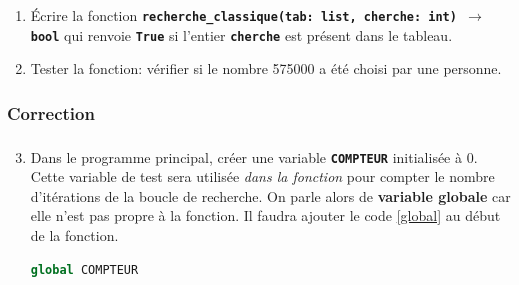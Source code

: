 \documentclass[svgnames,11pt]{beamer}
\begin{document}
\begin{frame}[fragile]
    \frametitle{}

    \begin{activite}
        \begin{enumerate}
            \item Écrire la fonction \textbf{\texttt{recherche\_classique(tab: list, cherche: int) $\rightarrow$ bool}} qui renvoie \textbf{\texttt{True}} si l'entier \textbf{\texttt{cherche}} est présent dans le tableau.
            \item Tester la fonction: vérifier si le nombre 575000 a été choisi par une personne.
        \end{enumerate}
    \end{activite} 
\end{frame}
\begin{frame}
    \frametitle{Correction}

    

\end{frame}
\begin{frame}[fragile]
    \frametitle{}
    \setcounter{compteuractivite}{1}

    \begin{activite}
    \begin{enumerate}
        \setcounter{enumi}{2}

        \item Dans le programme principal, créer une variable \textbf{\texttt{COMPTEUR}} initialisée à 0. Cette variable de test sera utilisée \emph{dans la fonction} pour compter le nombre d'itérations de la boucle de recherche. On parle alors de \textbf{variable globale} car elle n'est pas propre à la fonction. Il faudra ajouter le code \ref{global} au début de la fonction.
        \begin{center}
        \begin{lstlisting}[language=Python  , xleftmargin=2em, xrightmargin=2em]
global COMPTEUR
\end{lstlisting}
        \label{global}
        \end{center}
    \end{enumerate}
    \end{activite}

\end{frame}
\end{document}
